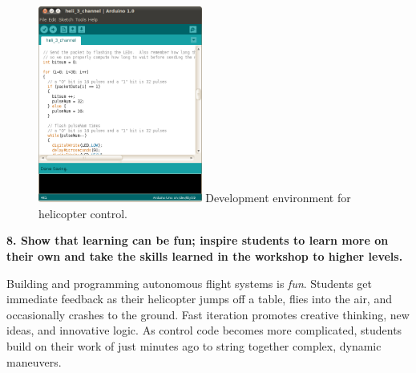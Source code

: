 \documentclass[11pt]{article}
\begin{document}
\vspace{20pt}
\begin{figure}
    \begin{center}
    \includegraphics[width=0.48\textwidth]{figures/program.png}
    {\small Development environment for helicopter control.}
    \end{center}
    \vspace{-20pt}
\end{figure}
\textbf{8. Show that learning can be fun; inspire students to learn more on their own and take the skills learned in the workshop to higher levels.}

Building and programming autonomous flight systems is \textit{fun}.  Students get immediate feedback as their helicopter jumps off a table, flies into the air, and occasionally crashes to the ground.  Fast iteration promotes creative thinking, new ideas, and innovative logic.  As control code becomes more complicated, students build on their work of just minutes ago to string together complex, dynamic maneuvers.




\end{document}
